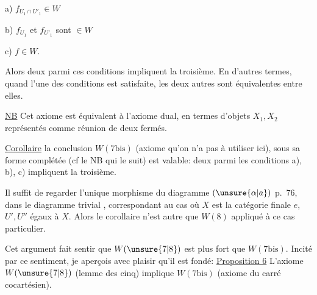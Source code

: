 a) $f_{U_1\cap U'_1}\in W$

b) $f_{U_1}$ et $f_{U'_1}$ sont $\in W$

c) $f\in W$.

Alors deux parmi ces conditions impliquent la troisième.
En d'autres termes, quand l'une des  conditions est satisfaite, les deux autres sont équivalentes
entre elles.

\uline{NB} Cet axiome est équivalent à l'axiome dual,
 en termes d'objets $X_1,X_2$ représentés  comme
réunion de deux fermés.

\uline{Corollaire}   la conclusion  $W(7\mathrm{bis})$ (axiome
qu'on n'a pas à utiliser ici), sous sa forme complétée
(cf le NB qui le suit) est valable: deux parmi les
conditions a), b), c) impliquent la troisième.

Il suffit de regarder l'unique morphisme
du diagramme $(\unsure{\alpha|a})$ p.~76, dans le diagramme
trivial
, correspondant au cas où
$X$ est la catégorie finale $e$,  $U',U''$ égaux à $X$. Alors le
corollaire n'est autre que $W(8)$ appliqué à ce
cas particulier.

Cet argument fait sentir que $W(\unsure{7|8})$ est  plus
fort que $W(7\mathrm{bis})$. Incité par ce sentiment, je 
aperçois avec plaisir qu'il est fondé:
\uline{Proposition 6} L'axiome $W(\unsure{7|8})$ (lemme des cinq)
implique $W(7\mathrm{bis})$ (axiome du carré cocartésien).

